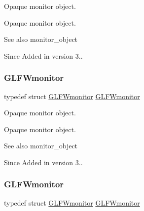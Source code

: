 Opaque monitor object. 

Opaque monitor object.

\begin{DoxySeeAlso}{See also}
monitor\+\_\+object
\end{DoxySeeAlso}
\begin{DoxySince}{Since}
Added in version 3.. 
\end{DoxySince}
\mbox{\label{group__monitor_ga8d9efd1cde9426692c73fe40437d0ae3}} 
\subsubsection{\texorpdfstring{G\+L\+F\+Wmonitor}{GLFWmonitor}\hspace{0.1cm}{\footnotesize\ttfamily [4/5]}}
{\footnotesize\ttfamily typedef struct \hyperlink{group__monitor_ga8d9efd1cde9426692c73fe40437d0ae3}{G\+L\+F\+Wmonitor} \hyperlink{group__monitor_ga8d9efd1cde9426692c73fe40437d0ae3}{G\+L\+F\+Wmonitor}}



Opaque monitor object. 

Opaque monitor object.

\begin{DoxySeeAlso}{See also}
monitor\+\_\+object
\end{DoxySeeAlso}
\begin{DoxySince}{Since}
Added in version 3.. 
\end{DoxySince}
\mbox{\label{group__monitor_ga8d9efd1cde9426692c73fe40437d0ae3}} 
\subsubsection{\texorpdfstring{G\+L\+F\+Wmonitor}{GLFWmonitor}\hspace{0.1cm}{\footnotesize\ttfamily [5/5]}}
{\footnotesize\ttfamily typedef struct \hyperlink{group__monitor_ga8d9efd1cde9426692c73fe40437d0ae3}{G\+L\+F\+Wmonitor} \hyperlink{group__monitor_ga8d9efd1cde9426692c73fe40437d0ae3}{G\+L\+F\+Wmonitor}}



